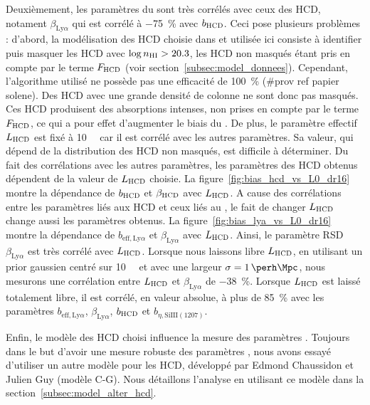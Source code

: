 \documentclass[11pt, twoside, a4paper, openright]{report}
\begin{document}
Deuxièmement, les paramètres du \lya{} sont très corrélés avec ceux des HCD, notament $\beta_{\mathrm{Ly}\alpha}$ qui est corrélé à \SI{-75}{\percent} avec $b_{\textsc{HCD}}$. Ceci pose plusieurs problèmes : d'abord, la modélisation des HCD choisie dans \textcite{DuMasdesBourboux2020} et utilisée ici consiste à identifier puis masquer les HCD avec $\log n_{\textsc{HI}} > \num{20.3}$, les HCD non masqués étant pris en compte par le terme $F_{\textsc{HCD}}$ (voir section~\ref{subsec:model_donnees}). Cependant, l'algorithme utilisé ne possède pas une efficacité de \SI{100}{\percent} (\#prov ref papier solene). Des HCD avec une grande densité de colonne ne sont donc pas masqués.
Ces HCD produisent des absorptions intenses, non prises en compte par le terme $F_{\textsc{HCD}}$, ce qui a pour effet d'augmenter le biais du \lya{}.
De plus, le paramètre effectif $L_{\textsc{HCD}}$ est fixé à \SI{10}{\perh\Mpc} car il est corrélé avec les autres paramètres.
Sa valeur, qui dépend de la distribution des HCD non masqués, est difficile à déterminer.
Du fait des corrélations avec les autres paramètres, les paramètres des HCD obtenus dépendent de la valeur de $L_{\textsc{HCD}}$ choisie.
La figure~\ref{fig:bias_hcd_vs_L0_dr16} montre la dépendance de $b_{\textsc{HCD}}$ et $\beta_{\textsc{HCD}}$ avec $L_{\textsc{HCD}}$.
A cause des corrélations entre les paramètres liés aux HCD et ceux liés au \lya{}, le fait de changer $L_{\textsc{HCD}}$ change aussi les paramètres \lya{} obtenus.
La figure~\ref{fig:bias_lya_vs_L0_dr16} montre la dépendance de $b_{\mathrm{eff},\mathrm{Ly}\alpha}$ et $\beta_{\mathrm{Ly}\alpha}$ avec $L_{\textsc{HCD}}$. Ainsi, le paramètre RSD $\beta_{\mathrm{Ly}\alpha}$ est très corrélé avec $L_{\textsc{HCD}}$. Lorsque nous laissons libre $L_{\textsc{HCD}}$, en utilisant un prior gaussien centré sur \SI{10}{\perh\Mpc} et avec une largeur $\sigma = \SI{1}{\perh\Mpc}$, nous mesurons une corrélation entre $L_{\textsc{HCD}}$ et $\beta_{\mathrm{Ly}\alpha}$ de \SI{-38}{\percent}. Lorsque $L_{\textsc{HCD}}$ est laissé totalement libre, il est corrélé, en valeur absolue, à plus de \SI{85}{\percent} avec les paramètres $b_{\mathrm{eff},\mathrm{Ly}\alpha}$, $\beta_{\mathrm{Ly}\alpha}$, $b_{\textsc{HCD}}$ et $b_{\eta, \mathrm{SiIII}(1207)}$.

Enfin, le modèle des HCD choisi influence la mesure des paramètres \lya{}. Toujours dans le but d'avoir une mesure robuste des paramètres \lya{}, nous avons essayé d'utiliser un autre modèle pour les HCD, développé par Edmond Chaussidon et Julien Guy (modèle C-G). Nous détaillons l'analyse en utilisant ce modèle dans la section~\ref{subsec:model_alter_hcd}.
\end{document}
